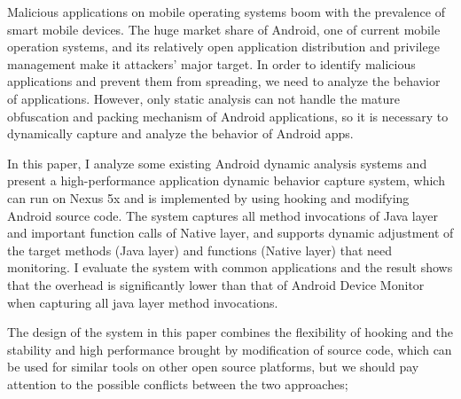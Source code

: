 



\begin{enabstract}
Malicious applications on mobile operating systems boom with the prevalence of smart mobile devices. The huge market share of Android, one of current mobile operation systems, and its relatively open application distribution and privilege management make it attackers' major target. In order to identify malicious applications and prevent them from spreading, we need to analyze the behavior of applications. However,  only static analysis can not handle the mature obfuscation and packing mechanism of Android applications, so it is necessary to dynamically capture and analyze the behavior of Android apps.

In this paper, I analyze some existing Android dynamic analysis systems and present a high-performance application dynamic behavior capture system, which can run on Nexus 5x and is implemented by using hooking and modifying Android source code. The system captures all method invocations of Java layer and important function calls of Native layer, and supports dynamic adjustment of the target methods (Java layer) and functions (Native layer) that need monitoring. I evaluate the system with common applications and the result shows that the overhead is significantly lower than that of Android Device Monitor when capturing all java layer method invocations.

The design of the system in ​​this paper combines the flexibility of hooking and the stability and high performance brought by modification of source code, which can be used for similar tools on other open source platforms, but we should pay attention to the possible conflicts between the two approaches;

\end{enabstract}
\par
\vspace*{2em}

